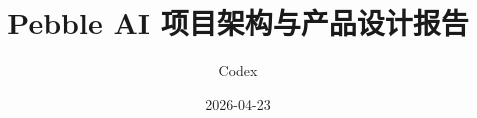 \documentclass[UTF8,11pt]{ctexrep}
\title{Pebble AI 项目架构与产品设计报告}
\subtitle{}
\author{Codex}
\date{2026-04-23}
\begin{document}
\makecustomtitle
\tableofcontents
\clearpage

\end{document}
